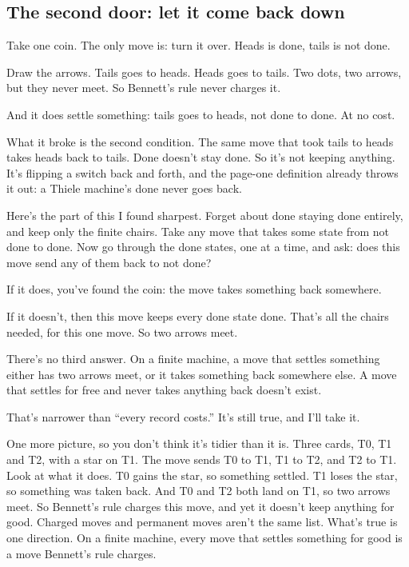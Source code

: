 \documentclass[11pt,twoside]{article}
\theoremstyle{thielethm}
\theoremstyle{thieledef}
\theoremstyle{thieledef}
\theoremstyle{thieledef}
\theoremstyle{thielethm}
\theoremstyle{thieleobs}
\theoremstyle{thielethm}
\begin{document}
\subsection{The second door: let it come back down}

Take one coin. The only move is: turn it over. Heads is done, tails is not done.

Draw the arrows. Tails goes to heads. Heads goes to tails. Two dots, two arrows, but they never meet. So Bennett's rule never charges it.

And it does settle something: tails goes to heads, not done to done. At no cost.

What it broke is the second condition. The same move that took tails to heads takes heads back to tails. Done doesn't stay done. So it's not keeping anything. It's flipping a switch back and forth, and the page-one definition already throws it out: a Thiele machine's done never goes back.

Here's the part of this I found sharpest. Forget about done staying done entirely, and keep only the finite chairs. Take any move that takes some state from not done to done. Now go through the done states, one at a time, and ask: does this move send any of them back to not done?

If it does, you've found the coin: the move takes something back somewhere.

If it doesn't, then this move keeps every done state done. That's all the chairs needed, for this one move. So two arrows meet.

There's no third answer. On a finite machine, a move that settles something either has two arrows meet, or it takes something back somewhere else. A move that settles for free and never takes anything back doesn't exist.

That's narrower than ``every record costs.'' It's still true, and I'll take it.

One more picture, so you don't think it's tidier than it is. Three cards, T0, T1 and T2, with a star on T1. The move sends T0 to T1, T1 to T2, and T2 to T1. Look at what it does. T0 gains the star, so something settled. T1 loses the star, so something was taken back. And T0 and T2 both land on T1, so two arrows meet. So Bennett's rule charges this move, and yet it doesn't keep anything for good. Charged moves and permanent moves aren't the same list. What's true is one direction. On a finite machine, every move that settles something for good is a move Bennett's rule charges.
\end{document}
